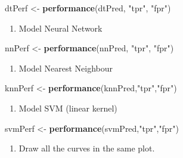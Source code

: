 \documentclass[]{article}
\newenvironment{Shaded}{\begin{snugshade}}{\end{snugshade}}
\newcommand{\KeywordTok}[1]{\textcolor[rgb]{0.13,0.29,0.53}{\textbf{#1}}}
\newcommand{\NormalTok}[1]{#1}
\newcommand{\StringTok}[1]{\textcolor[rgb]{0.31,0.60,0.02}{#1}}
\providecommand{\tightlist}{%
  \setlength{\itemsep}{0pt}\setlength{\parskip}{0pt}}
\begin{document}
\begin{Shaded}
\begin{Highlighting}[]
\NormalTok{dtPerf <-}\StringTok{ }\KeywordTok{performance}\NormalTok{(dtPred, }\StringTok{"tpr"}\NormalTok{, }\StringTok{"fpr"}\NormalTok{)}
\end{Highlighting}
\end{Shaded}

\begin{enumerate}
\def\labelenumi{\arabic{enumi}.}
\setcounter{enumi}{2}
\tightlist
\item
  Model Neural Network
\end{enumerate}

\begin{Shaded}
\begin{Highlighting}[]
\NormalTok{nnPerf <-}\StringTok{ }\KeywordTok{performance}\NormalTok{(nnPred, }\StringTok{"tpr"}\NormalTok{, }\StringTok{"fpr"}\NormalTok{)}
\end{Highlighting}
\end{Shaded}

\begin{enumerate}
\def\labelenumi{\arabic{enumi}.}
\setcounter{enumi}{3}
\tightlist
\item
  Model Nearest Neighbour
\end{enumerate}

\begin{Shaded}
\begin{Highlighting}[]
\NormalTok{knnPerf <-}\StringTok{ }\KeywordTok{performance}\NormalTok{(knnPred,}\StringTok{"tpr"}\NormalTok{,}\StringTok{"fpr"}\NormalTok{)}
\end{Highlighting}
\end{Shaded}

\begin{enumerate}
\def\labelenumi{\arabic{enumi}.}
\setcounter{enumi}{4}
\tightlist
\item
  Model SVM (linear kernel)
\end{enumerate}

\begin{Shaded}
\begin{Highlighting}[]
\NormalTok{svmPerf <-}\StringTok{ }\KeywordTok{performance}\NormalTok{(svmPred,}\StringTok{"tpr"}\NormalTok{,}\StringTok{"fpr"}\NormalTok{)}
\end{Highlighting}
\end{Shaded}

\begin{enumerate}
\def\labelenumi{\alph{enumi})}
\setcounter{enumi}{3}
\tightlist
\item
  Draw all the curves in the same plot.
\end{enumerate}
\end{document}
